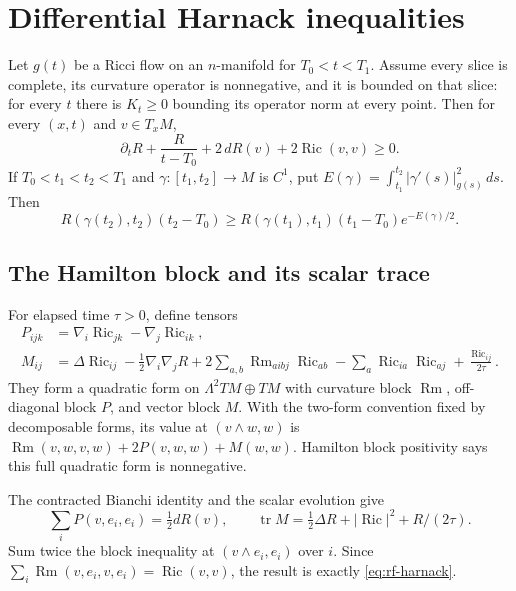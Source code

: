 \section{Differential Harnack inequalities}
\label{sec:rf-harnack}

\begin{theorem}\label{thm:rf-harnack}
Let $g(t)$ be a Ricci flow on an $n$-manifold for $T_0<t<T_1$.
Assume every slice is complete, its curvature operator is nonnegative,
and it is bounded on that slice: for every $t$ there is $K_t\geq0$
bounding its operator norm at every point.  Then for every $(x,t)$
and $v\in T_xM$,
\begin{equation}\label{eq:rf-harnack}
 \partial_tR+\frac{R}{t-T_0}+2\,dR(v)+2\operatorname{Ric}(v,v)\geq0.
\end{equation}
If $T_0<t_1<t_2<T_1$ and $\gamma:[t_1,t_2]\to M$ is $C^1$, put
$E(\gamma)=\int_{t_1}^{t_2}|\gamma'(s)|_{g(s)}^2\,ds$.  Then
\begin{equation}\label{eq:rf-harnack-path}
 R(\gamma(t_2),t_2)(t_2-T_0)\geq
 R(\gamma(t_1),t_1)(t_1-T_0)e^{-E(\gamma)/2}.
\end{equation}
\end{theorem}

\subsection{The Hamilton block and its scalar trace}

For elapsed time $\tau>0$, define tensors
\[
\begin{split}
 P_{ijk}&=\nabla_i\operatorname{Ric}_{jk}
                         -\nabla_j\operatorname{Ric}_{ik},\\
 M_{ij}&=\Delta\operatorname{Ric}_{ij}
       -\tfrac12\nabla_i\nabla_jR
       +2\sum_{a,b}\operatorname{Rm}_{aibj}\operatorname{Ric}_{ab}
       -\sum_a\operatorname{Ric}_{ia}\operatorname{Ric}_{aj}
       +\frac{\operatorname{Ric}_{ij}}{2\tau}.
\end{split}
\]
They form a quadratic form on $\Lambda^2 TM\oplus TM$ with curvature
block $\operatorname{Rm}$, off-diagonal block $P$, and vector block
$M$.  With the two-form convention fixed by decomposable forms, its
value at $(v\wedge w,w)$ is
$\operatorname{Rm}(v,w,v,w)+2P(v,w,w)+M(w,w)$.
Hamilton block positivity says this full quadratic form is nonnegative.

The contracted Bianchi identity and the scalar evolution give
\[
 \sum_iP(v,e_i,e_i)=\tfrac12dR(v),\qquad
 \operatorname{tr}M=\tfrac12\Delta R+|\operatorname{Ric}|^2
                                      +R/(2\tau).
\]
Sum twice the block inequality at $(v\wedge e_i,e_i)$ over $i$.
Since $\sum_i\operatorname{Rm}(v,e_i,v,e_i)=\operatorname{Ric}(v,v)$,
the result is exactly \eqref{eq:rf-harnack}.

